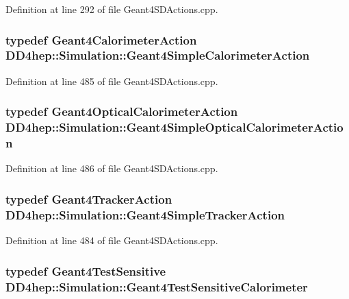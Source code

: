 Definition at line 292 of file Geant4SDActions.cpp.\hypertarget{namespace_d_d4hep_1_1_simulation_a567bbed97768b8a89f60e745b6d3dd51}{
\subsubsection[{Geant4SimpleCalorimeterAction}]{\setlength{\rightskip}{0pt plus 5cm}typedef {\bf Geant4CalorimeterAction} {\bf DD4hep::Simulation::Geant4SimpleCalorimeterAction}}}
\label{namespace_d_d4hep_1_1_simulation_a567bbed97768b8a89f60e745b6d3dd51}


Definition at line 485 of file Geant4SDActions.cpp.\hypertarget{namespace_d_d4hep_1_1_simulation_a3017d956ee0a02d03e54c12486dd9230}{
\subsubsection[{Geant4SimpleOpticalCalorimeterAction}]{\setlength{\rightskip}{0pt plus 5cm}typedef {\bf Geant4OpticalCalorimeterAction} {\bf DD4hep::Simulation::Geant4SimpleOpticalCalorimeterAction}}}
\label{namespace_d_d4hep_1_1_simulation_a3017d956ee0a02d03e54c12486dd9230}


Definition at line 486 of file Geant4SDActions.cpp.\hypertarget{namespace_d_d4hep_1_1_simulation_a6f4f8c57d8b3239f579f31519e803afa}{
\subsubsection[{Geant4SimpleTrackerAction}]{\setlength{\rightskip}{0pt plus 5cm}typedef {\bf Geant4TrackerAction} {\bf DD4hep::Simulation::Geant4SimpleTrackerAction}}}
\label{namespace_d_d4hep_1_1_simulation_a6f4f8c57d8b3239f579f31519e803afa}


Definition at line 484 of file Geant4SDActions.cpp.\hypertarget{namespace_d_d4hep_1_1_simulation_a67912331acd262c46253c23cbc346cf5}{
\subsubsection[{Geant4TestSensitiveCalorimeter}]{\setlength{\rightskip}{0pt plus 5cm}typedef {\bf Geant4TestSensitive} {\bf DD4hep::Simulation::Geant4TestSensitiveCalorimeter}}}
\label{namespace_d_d4hep_1_1_simulation_a67912331acd262c46253c23cbc346cf5}


